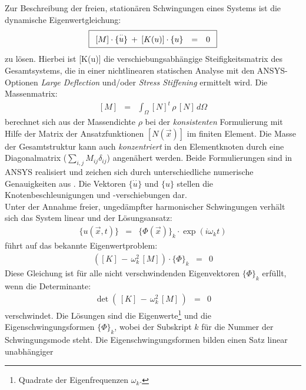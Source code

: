 Zur Beschreibung der freien, stationären Schwingungen eines Systems ist die
dynamische Eigenwertgleichung:
\begin{equation}
\label{modal}
\fbox{$
 \displaystyle
 \begin{array}{rcl}
 [M] \cdot \{\stackrel{\cdot \cdot}{u}\} \: +  \:
 [K(u)] \cdot \{u\} & = & 0
 \end{array}
 $}
\end{equation}
zu lösen. Hierbei ist [K(u)] die verschiebungsabhängige Steifigkeitsmatrix
des Gesamtsystems, die in einer nichtlinearen statischen Analyse mit den
{\sf ANSYS}-Optionen {\em Large Deflection} und/oder {\em Stress Stiffening}
ermittelt wird. Die Massenmatrix:
\begin{eqnarray}
\label{massmatrix}
 [M] & = & \int_{\Omega} [N]^{t} \, \rho \, [N] \, d\Omega
\end{eqnarray}
berechnet sich aus der Massendichte $\rho$ bei der {\em konsistenten}
Formulierung mit Hilfe der Matrix der Ansatzfunktionen $[N(\vec x)]$ im
finiten Element. Die Masse der Gesamtstruktur kann auch {\em konzentriert}
in den Elementknoten durch eine Diagonalmatrix
($\sum_{i,j} M_{ij}\delta_{ij}$)
angenähert werden. Beide Formulierungen sind in {\sf ANSYS} realisiert
und zeichen sich durch unterschiedliche numerische Genauigkeiten aus
\cite{Ram90}.
Die Vektoren $\{\stackrel{\cdot \cdot}{u}\}$ und $\{u\}$ stellen die
Knotenbeschleunigungen und -verschiebungen dar.\\
Unter der Annahme freier,
ungedämpfter harmonischer Schwingungen verhält sich das System linear und
der Lösungsansatz:
\begin{eqnarray}
 \{u(\vec x,t)\} & = & \{ \Phi(\vec x) \}_{k} \cdot \exp (i \omega_{k}t)
\end{eqnarray}
führt auf das bekannte Eigenwertproblem:
\begin{eqnarray}
\label{ewp}
 \left ( [K] \, - \, \omega_{k}^{2} \, [M] \right ) \cdot
 \{ \Phi \}_{k} & = & 0
\end{eqnarray}
Diese Gleichung ist für alle nicht verschwindenden Eigenvektoren
$\{\Phi\}_{k}$ erfüllt, wenn die Determinante:
\begin{eqnarray}
 \det ( \, [K] \, - \,\omega_{k}^{2} \, [M] \,) & = & 0
\end{eqnarray}
verschwindet. Die Lösungen sind die Eigenwerte\footnote{Quadrate der
Eigenfrequenzen $\omega_{k}$.} und die Eigenschwingungsformen
$\{\Phi\}_{k} $, wobei der Subskript $k$ für die Nummer der Schwingungsmode
steht. Die Eigenschwingungsformen bilden einen Satz linear unabhängiger
